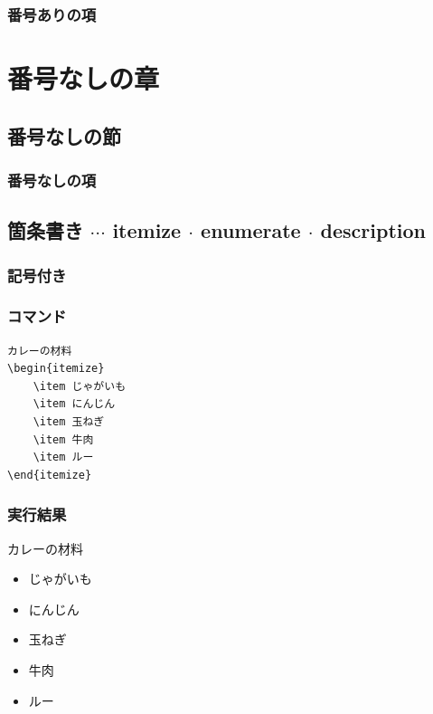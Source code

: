 \documentclass[a4j, titlepage]{jarticle}
\begin{document}
\begin{multicols}{2}
\begin{screen}
    \subsubsection{番号ありの項}

    \section*{番号なしの章}
    \subsection*{番号なしの節}
    \subsubsection*{番号なしの項}

\end{screen}
\end{multicols}
\setcounter{section}{1}


\subsection{箇条書き $\cdots$ itemize $\cdot$ enumerate $\cdot$ description}

\subsubsection{記号付き}
\begin{multicols}{2}

\subsubsection*{コマンド}
\begin{lstlisting}
カレーの材料
\begin{itemize}
    \item じゃがいも
    \item にんじん
    \item 玉ねぎ
    \item 牛肉
    \item ルー
\end{itemize}
\end{lstlisting}

\vfill\null
\columnbreak

\subsubsection*{実行結果}
\begin{screen}

    カレーの材料
    \begin{itemize}
        \item じゃがいも
        \item にんじん
        \item 玉ねぎ
        \item 牛肉
        \item ルー
    \end{itemize}

\end{screen}
\end{multicols}
\end{document}
